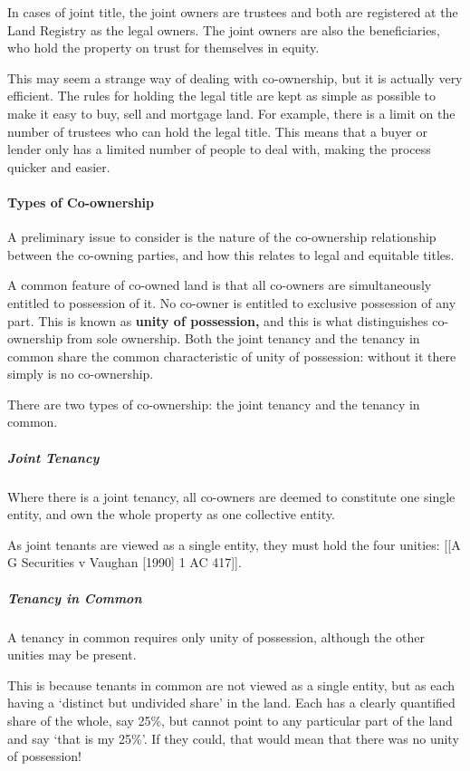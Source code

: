 \documentclass[
]{article}
\begin{document}
In cases of joint title, the joint owners are trustees and both are
registered at the Land Registry as the legal owners. The joint owners
are also the beneficiaries, who hold the property on trust for
themselves in equity.

This may seem a strange way of dealing with co-ownership, but it is
actually very efficient. The rules for holding the legal title are kept
as simple as possible to make it easy to buy, sell and mortgage land.
For example, there is a limit on the number of trustees who can hold the
legal title. This means that a buyer or lender only has a limited number
of people to deal with, making the process quicker and easier.

\hypertarget{types-of-co-ownership}{%
\paragraph{Types of Co-ownership}\label{types-of-co-ownership}}

A preliminary issue to consider is the nature of the co-ownership
relationship between the co-owning parties, and how this relates to
legal and equitable titles.

A common feature of co-owned land is that all co-owners are
simultaneously entitled to possession of it. No co-owner is entitled to
exclusive possession of any part. This is known as \textbf{unity of
possession,} and this is what distinguishes co-ownership from sole
ownership. Both the joint tenancy and the tenancy in common share the
common characteristic of unity of possession: without it there simply is
no co-ownership.

There are two types of co-ownership: the joint tenancy and the tenancy
in common.

\hypertarget{joint-tenancy}{%
\subparagraph{Joint Tenancy}\label{joint-tenancy}}

Where there is a joint tenancy, all co-owners are deemed to constitute
one single entity, and own the whole property as one collective entity.

As joint tenants are viewed as a single entity, they must hold the four
unities: {[}{[}A G Securities v Vaughan {[}1990{]} 1 AC 417{]}{]}.

\hypertarget{tenancy-in-common}{%
\subparagraph{Tenancy in Common}\label{tenancy-in-common}}

A tenancy in common requires only unity of possession, although the
other unities may be present.

This is because tenants in common are not viewed as a single entity, but
as each having a `distinct but undivided share' in the land. Each has a
clearly quantified share of the whole, say 25\%, but cannot point to any
particular part of the land and say `that is my 25\%'. If they could,
that would mean that there was no unity of possession!
\end{document}
